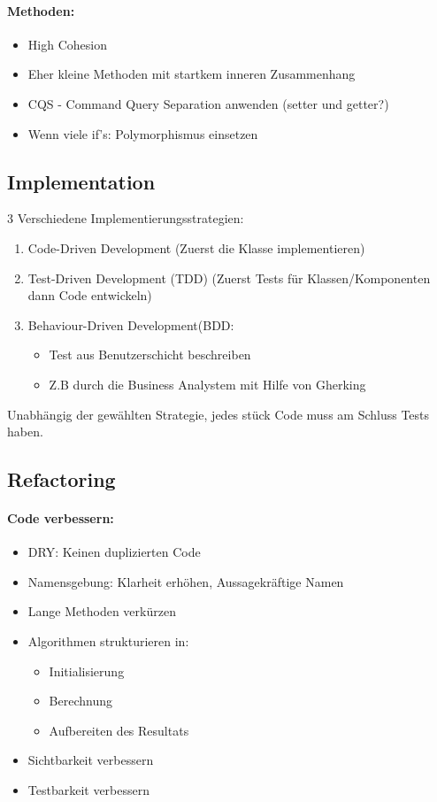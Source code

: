 \documentclass[../ZF_SWEN1.tex]{subfiles}
\begin{document}
\paragraph{Methoden:}
\begin{itemize}
	\item High Cohesion
	\item Eher kleine Methoden mit startkem inneren Zusammenhang
	\item CQS - Command Query Separation anwenden (setter und getter?)
	\item Wenn viele if's: Polymorphismus einsetzen
\end{itemize}

\subsection{Implementation}

3 Verschiedene Implementierungsstrategien:
\begin{enumerate}
	\item Code-Driven Development (Zuerst die Klasse implementieren)
	\item Test-Driven Development (TDD) (Zuerst Tests für Klassen/Komponenten dann Code entwickeln)
	\item Behaviour-Driven Development(BDD:
	\begin{itemize}
		\item Test aus Benutzerschicht beschreiben
		\item Z.B durch die Business Analystem mit Hilfe von Gherking
	\end{itemize}
\end{enumerate}

Unabhängig der gewählten Strategie, jedes stück Code muss am Schluss Tests haben.

\subsection{Refactoring}

\paragraph{Code verbessern:}
\begin{itemize}
	\item DRY: Keinen duplizierten Code
	\item Namensgebung: Klarheit erhöhen, Aussagekräftige Namen
	\item Lange Methoden verkürzen
	\item Algorithmen strukturieren in:
	\begin{itemize}
		\item Initialisierung
		\item Berechnung
		\item Aufbereiten des Resultats
	\end{itemize}
	\item Sichtbarkeit verbessern
	\item Testbarkeit verbessern
\end{itemize}
\end{document}
